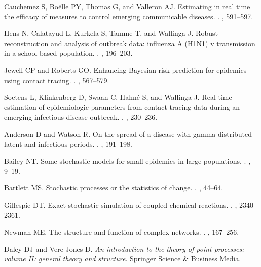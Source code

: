 \documentclass[12pt]{article}
\begin{document}
\begin{thebibliography}{10}
Cauchemez S, Bo{\"e}lle PY, Thomas G, and Valleron AJ.
 Estimating in real time the efficacy of measures to control
  emerging communicable diseases.
.
, 591--597.

Hens N, Calatayud L, Kurkela S, Tamme T, and Wallinga J.
 Robust reconstruction and analysis of outbreak data: influenza
  {A (H1N1)} v transmission in a school-based population.
.
, 196--203.

Jewell CP and Roberts GO.
 Enhancing {Bayesian} risk prediction for epidemics using contact
  tracing.
.
, 567--579.

Soetens L, Klinkenberg D, Swaan C, Hahn{\'e} S, and Wallinga J.
 Real-time estimation of epidemiologic parameters from contact
  tracing data during an emerging infectious disease outbreak.
.
, 230--236.

Anderson D and Watson R.
 On the spread of a disease with gamma distributed latent and
  infectious periods.
.
, 191--198.

Bailey NT.
 Some stochastic models for small epidemics in large populations.
.
, 9--19.

Bartlett MS.
 Stochastic processes or the statistics of change.
.
, 44--64.

Gillespie DT.
 Exact stochastic simulation of coupled chemical reactions.
.
, 2340--2361.

Newman ME.
 The structure and function of complex networks.
.
, 167--256.

Daley DJ and Vere-Jones D.
 {\em {An introduction to the theory of point processes: volume
  II: general theory and structure}}.
\newblock Springer Science \& Business Media.


\end{thebibliography}
\end{document}
